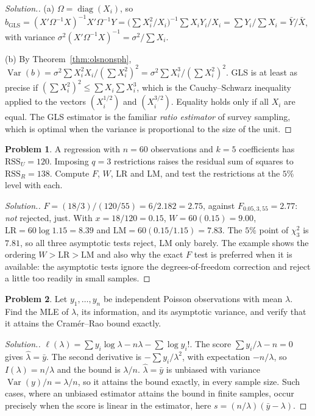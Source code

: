 \documentclass[11pt,a4paper]{article}
\numberwithin{equation}{section}
\DeclareMathOperator{\Var}{Var}
\theoremstyle{definition}
\newtheorem{problemx}{Problem}[subsection]
\newenvironment{problem}{\begin{problemx}}{\end{problemx}}
\newenvironment{solution}
  {\renewcommand{\qedsymbol}{}\begin{proof}[\textit{Solution}.]}
  {\end{proof}}
\begin{document}
\begin{solution}
(a) $\Omega = \operatorname{diag}(X_i)$, so $b_{\text{GLS}} = (X'\Omega^{-1}X)^{-1}X'\Omega^{-1}Y = \bigl(\sum X_i^2/X_i\bigr)^{-1}\sum X_iY_i/X_i = \sum Y_i/\sum X_i = \bar Y/\bar X$, with variance
$\sigma^2(X'\Omega^{-1}X)^{-1} = \sigma^2/\sum X_i$.

(b) By Theorem~\ref{thm:olsnonsph}, $\Var(b) = \sigma^2\sum X_i^2X_i/(\sum X_i^2)^2 = \sigma^2\sum X_i^3/(\sum X_i^2)^2$. GLS is at least as precise if
$(\sum X_i^2)^2 \leq \sum X_i\sum X_i^3$, which is the Cauchy--Schwarz inequality applied to the vectors $(X_i^{1/2})$ and $(X_i^{3/2})$. Equality holds only if all
$X_i$ are equal. The GLS estimator is the familiar \emph{ratio estimator} of survey sampling, which is optimal when the variance is proportional to the size
of the unit.
\end{solution}

\begin{problem}
A regression with $n = 60$ observations and $k = 5$ coefficients has $\text{RSS}_U = 120$. Imposing $q = 3$ restrictions raises the residual sum of squares to
$\text{RSS}_R = 138$. Compute $F$, $W$, LR and LM, and test the restrictions at the $5\%$ level with each.
\end{problem}

\begin{solution}
$F = (18/3)/(120/55) = 6/2.182 = 2.75$, against $F_{0.05,3,55} = 2.77$: \emph{not} rejected, just. With $x = 18/120 = 0.15$,
$W = 60(0.15) = 9.00$, $\text{LR} = 60\log1.15 = 8.39$ and $\text{LM} = 60(0.15/1.15) = 7.83$. The $5\%$ point of $\chi^2_3$ is $7.81$, so all three asymptotic tests
reject, LM only barely. The example shows the ordering $W > \text{LR} > \text{LM}$ and also why the exact $F$ test is preferred when it is available: the
asymptotic tests ignore the degrees-of-freedom correction and reject a little too readily in small samples.
\end{solution}

\begin{problem}
Let $y_1, \dots, y_n$ be independent Poisson observations with mean $\lambda$. Find the MLE of $\lambda$, its information, and its asymptotic variance, and verify that
it attains the Cram\'er--Rao bound exactly.
\end{problem}

\begin{solution}
$\ell(\lambda) = \sum y_i\log\lambda - n\lambda - \sum\log y_i!$. The score $\sum y_i/\lambda - n = 0$ gives $\hat\lambda = \bar y$. The second derivative is $-\sum y_i/\lambda^2$, with
expectation $-n/\lambda$, so $I(\lambda) = n/\lambda$ and the bound is $\lambda/n$. $\hat\lambda = \bar y$ is unbiased with variance $\Var(y)/n = \lambda/n$, so it attains the bound
exactly, in every sample size. Such cases, where an unbiased estimator attains the bound in finite samples, occur precisely when the score is linear in
the estimator, here $s = (n/\lambda)(\bar y - \lambda)$.
\end{solution}
\end{document}
